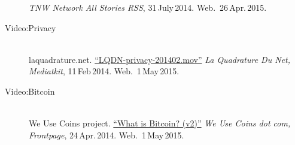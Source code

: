 \documentclass[english, DIV=calc, BCOR=5mm, fontsize=11pt, portrait]{scrartcl}	 %
\begin{document}
\begin{description}
		\emph{TNW Network All Stories RSS}, 31\,July\,2014.
		Web.~26\,Apr.\,2015.
	\item[Video:Privacy] \hfill \\
		laquadrature.net.
		\href{https://mediakit.laquadrature.net/view.php?id=1302}{\enquote{LQDN-privacy-201402.mov}}
		\emph{La Quadrature Du Net, Mediatkit}, 11\,Feb\,2014.
		Web.~1\,May\,2015.
	\item[Video:Bitcoin] \hfill \\
		We Use Coins project.
		\href{http://youtu.be/Gc2en3nHxA4}{\enquote{What is Bitcoin? (v2)}}
		\emph{We Use Coins dot com, Frontpage}, 24\,Apr.\,2014.
		Web.~1\,May\,2015.

\end{description}
\end{document}
